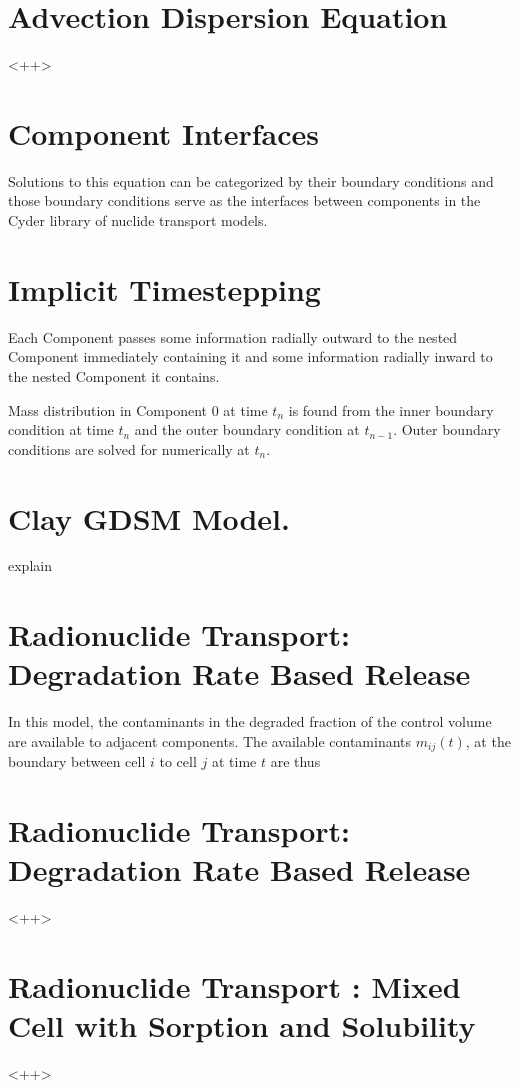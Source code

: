 \documentclass[letterpaper]{article}
\begin{document}
  \section*{Advection Dispersion Equation}
<++>

  \section*{Component Interfaces}
Solutions to this equation can be categorized by their boundary conditions and 
those boundary conditions serve as the interfaces between components in the 
Cyder library of nuclide transport models.

\section*{Implicit Timestepping}
Each Component passes some information radially outward to the nested 
Component immediately containing it and some information radially 
inward to the nested Component it contains. 

Mass distribution in Component 0 at time $t_n$ is found from the inner boundary 
condition at time $t_n$ and the outer boundary condition at $t_{n-1}$. Outer 
boundary conditions are solved for numerically at $t_n$.

\section*{Clay GDSM Model.}
explain

  \section*{Radionuclide Transport: Degradation Rate Based Release}
In this model, the contaminants in the degraded fraction of the control volume 
are available to adjacent components. The available contaminants
$m_{ij}(t)$, at the boundary between cell $i$ to cell $j$ at time $t$ are thus

  \section*{Radionuclide Transport: Degradation Rate Based Release}
<++>

  \section*{Radionuclide Transport : Mixed Cell with Sorption and Solubility}
<++>
\end{document}
